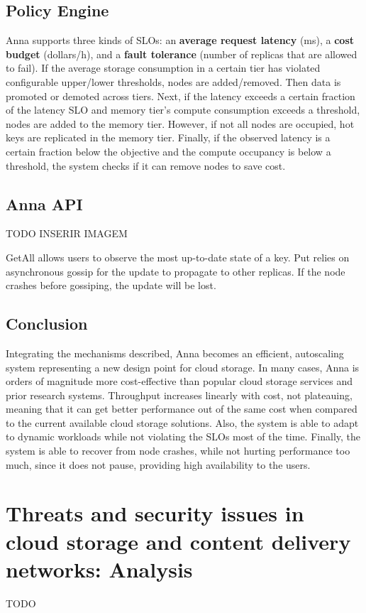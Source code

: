 \documentclass[14pt,oneside]{extreport}
\newcommand*\fpar{\hspace{1ex}}
\begin{document}
  \section{Policy Engine}
  \fpar Anna supports three kinds of SLOs: an \textbf{average request latency} (ms), a \textbf{cost budget} (dollars/h), and a \textbf{fault tolerance} (number of replicas that are allowed to fail). If the average storage consumption in a certain tier has violated configurable upper/lower thresholds, nodes are added/removed. Then data is promoted or demoted across tiers. Next, if the latency exceeds a certain fraction of the latency SLO and memory tier’s compute consumption exceeds a threshold, nodes are added to the memory tier. However, if not all nodes are occupied, hot keys are replicated in the memory tier. Finally, if the observed latency is a certain fraction below the objective and the compute occupancy is below a threshold, the system checks if it can remove nodes to save cost.

  \section{Anna API}
  \fpar TODO INSERIR IMAGEM
  \par GetAll allows users to observe the most up-to-date state of a key. Put relies on asynchronous gossip for the update to propagate to other replicas. If the node crashes before gossiping, the update will be lost.

  \section{Conclusion}
  \fpar Integrating the mechanisms described, Anna becomes an efficient, autoscaling system representing a new design point for cloud storage. In many cases, Anna is orders of magnitude more cost-effective than popular cloud storage services and prior research systems. Throughput increases linearly with cost, not plateauing, meaning that it can get better performance out of the same cost when compared to the current available cloud storage solutions. Also, the system is able to adapt to dynamic workloads while not violating the SLOs most of the time. Finally, the system is able to recover from node crashes, while not hurting performance too much, since it does not pause, providing high availability to the users.

\chapter{Threats and security issues in cloud storage and content delivery networks: Analysis \cite{paper3}}
\fpar TODO
\end{document}
